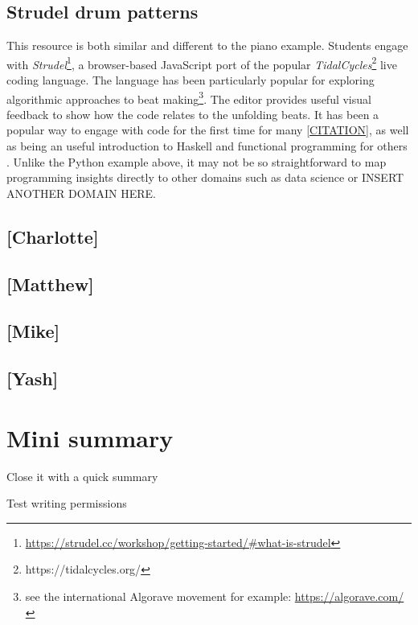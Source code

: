 \subsection{Strudel drum patterns}
This resource is both similar and different to the piano example. Students engage with \emph{Strudel}\footnote{\url{https://strudel.cc/workshop/getting-started/\#what-is-strudel}}, a browser-based JavaScript port of the popular \emph{TidalCycles}\footnote{https://tidalcycles.org/} live coding language. The language has been particularly popular for exploring algorithmic approaches to beat making\footnote{see the international Algorave movement for example: \url{https://algorave.com/}}. The editor provides useful visual feedback to show how the code relates to the unfolding beats. It has been a popular way to engage with code for the first time for many \ref{CITATION}, as well as being an useful introduction to Haskell and functional programming for others \cite{CITATION}. Unlike the Python example above, it may not be so straightforward to map programming insights directly to other domains such as data science or INSERT ANOTHER DOMAIN HERE.

\subsection{[Charlotte]}
% 

\subsection{[Matthew]}

\subsection{[Mike]}

\subsection{[Yash]}


\section{Mini summary}
Close it with a quick summary

Test writing permissions
